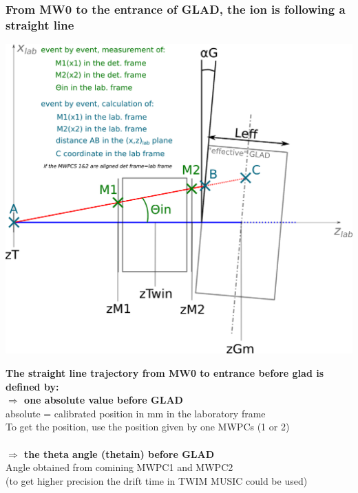 \documentclass[12pt, letterpaper]{article}
\begin{document}
\subsubsection{From MW0 to the entrance of GLAD, the ion is following a straight line}\label{sssec:num1}
\begin{center}
	\includegraphics[width=1.0\textwidth]{tracking_upstreamGLAD.png}
\end{center}
\textbf{The straight line trajectory from MW0 to  entrance before glad is defined by:}\\
\textbf{$\Rightarrow$ one absolute value before GLAD}\\
absolute = calibrated position in mm in the laboratory frame\\
To get the position, use the position given by one MWPCs (1 or 2)\\
\\
\textbf{$\Rightarrow$ the theta angle (theta\textunderscore in) before GLAD}\\
Angle obtained from comining MWPC1 and MWPC2\\
(to get higher precision the drift time in TWIM MUSIC could be used)\\
\end{document}
